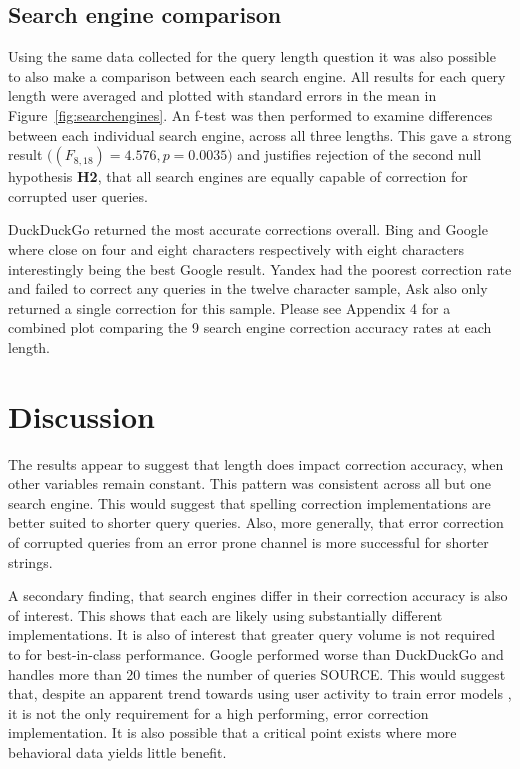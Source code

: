 \documentclass{csfourzero}
\begin{document}
\subsection{Search engine comparison}
Using the same data collected for the query length question it was also possible to also make a comparison between each search engine. All results for each query length were averaged and plotted with standard errors in the mean in Figure~\ref{fig:searchengines}. An f-test was then performed to examine differences between each individual search engine, across all three lengths. This gave a strong result $\big((F_{8,18}) = 4.576, p = 0.0035\big)$ and justifies rejection of the second null hypothesis \textbf{H2}, that all search engines are equally capable of correction for corrupted user queries.

DuckDuckGo returned the most accurate corrections overall. Bing and Google where close on four and eight characters respectively with eight characters interestingly being the best Google result. Yandex had the poorest correction rate and failed to correct any queries in the twelve character sample, Ask also only returned a single correction for this sample. Please see Appendix 4 for a combined plot comparing the 9 search engine correction accuracy rates at each length.

\section{Discussion}
\label{sec:discuss}

The results appear to suggest that length does impact correction accuracy, when other variables remain constant. This pattern was consistent across all but one search engine. This would suggest that spelling correction implementations are better suited to shorter query queries. Also, more generally, that error correction of corrupted queries from an error prone channel is more successful for shorter strings.

A secondary finding, that search engines differ in their correction accuracy is also of interest. This shows that each are likely using substantially different implementations. It is also of interest that greater query volume is not required to for best-in-class performance. Google performed worse than DuckDuckGo and handles more than 20 times the number of queries SOURCE. This would suggest that, despite an apparent trend towards using user activity to train error models \cite{webuserpoweredspelling, webuser3, webuser2learningerrormodel, webuser4google2009}, it is not the only requirement for a high performing, error correction implementation. It is also possible that a critical point exists where more behavioral data yields little benefit.
\end{document}
